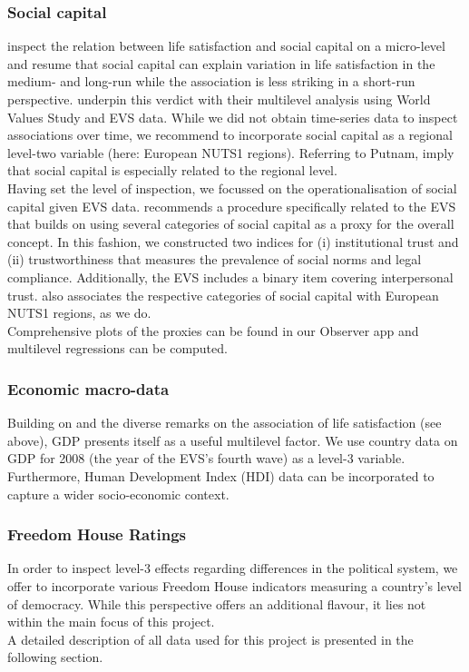 \documentclass[preprint,12pt,authoryear]{elsarticle}
\begin{document}
\subsubsection{Social capital} 
\citet{bartolini_happy_2014} inspect the relation between life satisfaction and social capital on a micro-level and resume that
social capital can explain variation in life satisfaction in the medium- and long-run while the association is less striking in a
short-run perspective. \citet{mikucka_when_2017} underpin this verdict with their multilevel analysis using World Values Study 
and EVS data. While we did not obtain time-series data to inspect associations over time, we recommend to incorporate 
social capital as a regional level-two variable (here: European NUTS1 regions). Referring to Putnam, \citet{Savelkoul_explaining_2011} imply that social 
capital is especially related to the regional level. \\
Having set the level of inspection, we focussed on the operationalisation of social capital given EVS data. \citet{van_schaik_social_2002}
recommends a procedure specifically related to the EVS that builds on using several categories of social capital as a proxy
for the overall concept. In this fashion, we constructed two indices for (i) institutional trust and (ii) trustworthiness that measures
the prevalence of social norms and legal compliance. Additionally, the EVS includes a binary item covering interpersonal trust. \citet{van_schaik_social_2002}
also associates the respective categories of social capital with European NUTS1 regions, as we do. \\
Comprehensive plots of the proxies can be found in our Observer app and multilevel regressions can be computed. 

\subsubsection{Economic macro-data}
Building on \citet{easterlin_does_1974} and the diverse remarks on the association of life satisfaction (see above), GDP presents itself
as a useful multilevel factor. We use country data on GDP for 2008 (the year of the EVS's fourth wave) as a level-3 variable.
Furthermore, Human Development Index (HDI) data can be incorporated to capture a wider socio-economic context. 

\subsubsection{Freedom House Ratings}
In order to inspect level-3 effects regarding differences in the political system, we offer to incorporate various Freedom House 
indicators measuring a country's level of democracy. While this perspective offers an additional flavour, it lies not within the main
focus of this project. \\
A detailed description of all data used for this project is presented in the following section. 	
	
\end{document}
